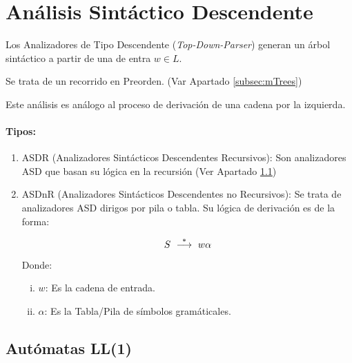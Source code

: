

\section{Análisis Sintáctico Descendente}

 Los Analizadores de Tipo Descendente (\textit{Top-Down-Parser}) generan un árbol sintáctico a partir de una de entra $w \in L$. 

{\cor Se trata de un recorrido en Preorden.} (Var Apartado \ref{subsec:mTrees})

{\cor Este análisis es análogo al proceso de derivación de una cadena por la izquierda.}

\paragraph*{Tipos:}


\begin{enumerate}

\item ASDR (Analizadores Sintácticos Descendentes Recursivos): Son analizadores ASD que basan su lógica en la recursión (Ver Apartado \ref{subsec:LL1})

\item ASDnR (Analizadores Sintácticos Descendentes no Recursivos): Se trata de analizadores ASD dirigos por pila o tabla. Su lógica de derivación es de la forma:

\begin{equation}
S\ \stackrel{*}{\longrightarrow}\ w \alpha \\
\end{equation}

Donde: 

\begin{enumerate}[i.]

\item $w$: Es la cadena de entrada.

\item $\alpha$: Es la Tabla/Pila de símbolos gramáticales.

\end{enumerate}

\end{enumerate}

\subsection{Autómatas LL(1)}
\label{subsec:LL1}


